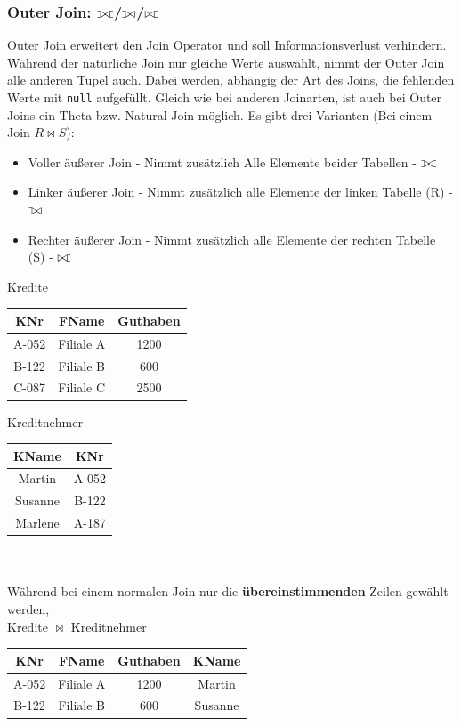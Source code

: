 \documentclass{article}
\def\ojoin{\setbox0=\hbox{$\bowtie$}%
  \rule[-.02ex]{.25em}{.4pt}\llap{\rule[\ht0]{.25em}{.4pt}}}
\def\lojoin{\mathbin{\ojoin\mkern-5.8mu\bowtie}}
\def\rojoin{\mathbin{\bowtie\mkern-5.8mu\ojoin}}
\def\fojoin{\mathbin{\ojoin\mkern-5.8mu\bowtie\mkern-5.8mu\ojoin}}
\begin{document}
 	\subsubsection{Outer Join: \texorpdfstring{$\fojoin$/$\lojoin$/$\rojoin$}{}}
 		Outer Join erweitert den Join Operator und soll Informationsverlust verhindern. Während der natürliche Join nur gleiche Werte auswählt, nimmt der Outer Join alle anderen Tupel auch. Dabei werden, abhängig der Art des Joins, die fehlenden Werte mit \verb|null| aufgefüllt. Gleich wie bei anderen Joinarten, ist auch bei Outer Joins ein Theta bzw. Natural Join möglich.
 		Es gibt drei Varianten (Bei einem Join $R \bowtie S$):
 		\begin{itemize}
 			\item{Voller äußerer Join - Nimmt zusätzlich Alle Elemente beider Tabellen - $\fojoin$}
 			\item{Linker äußerer Join - Nimmt zusätzlich alle Elemente der linken Tabelle (R) - $\lojoin$}
 			\item{Rechter äußerer Join - Nimmt zusätzlich alle Elemente der rechten Tabelle (S) - $\rojoin$}
 		\end{itemize}
 		Kredite
 		\begin{tabular}{| c | c | c |}
 			\toprule
 			KNr & FName & Guthaben \\ \midrule
 			A-052 & Filiale A & 1200 \\ \hline
 			B-122 & Filiale B & 600 \\ \hline
 			C-087 & Filiale C & 2500 \\
 			\bottomrule
 		\end{tabular}
 		Kreditnehmer
 		\begin{tabular}{| c | c |}
 			\toprule
 			KName & KNr \\ \midrule
 			Martin & A-052 \\ \hline
 			Susanne & B-122 \\ \hline
 			Marlene & A-187 \\
 			\bottomrule
 		\end{tabular} \\ \\
 		Während bei einem normalen Join nur die \textbf{übereinstimmenden} Zeilen gewählt werden, \\
 		Kredite $\bowtie$ Kreditnehmer
 		\begin{tabular}{| c | c | c | c |}
 			\toprule
 			KNr & FName & Guthaben & KName \\ \midrule
 			A-052 & Filiale A & 1200 & Martin \\ \hline
 			B-122 & Filiale B & 600 & Susanne \\
 			\bottomrule
 		\end{tabular} \\ \\
\end{document}
